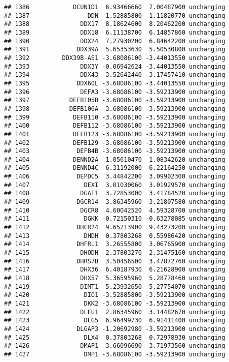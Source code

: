 \documentclass[]{article}
\begin{document}
\begin{verbatim}
## 1386            DCUN1D1  6.93466660  7.00487900 unchanging
## 1387                DDN -1.52885800 -1.11820770 unchanging
## 1388              DDX17  8.18624600  8.20462200 unchanging
## 1389              DDX18  6.11138700  6.14857860 unchanging
## 1390              DDX24  7.27930200  6.84642200 unchanging
## 1391             DDX39A  5.65353630  5.50530800 unchanging
## 1392         DDX39B-AS1 -3.68086100 -3.44013550 unchanging
## 1393              DDX3Y -0.06942624 -3.44013550 unchanging
## 1394              DDX43  3.52642440  3.17457410 unchanging
## 1395             DDX60L -3.68086100 -3.44013550 unchanging
## 1396              DEFA3 -3.68086100 -3.59213900 unchanging
## 1397           DEFB105B -3.68086100 -3.59213900 unchanging
## 1398           DEFB106A -3.68086100 -3.59213900 unchanging
## 1399            DEFB110 -3.68086100 -3.59213900 unchanging
## 1400            DEFB112 -3.68086100 -3.59213900 unchanging
## 1401            DEFB123 -3.68086100 -3.59213900 unchanging
## 1402            DEFB129 -3.68086100 -3.59213900 unchanging
## 1403             DEFB4B -3.68086100 -3.59213900 unchanging
## 1404            DENND2A  1.05610470  1.08342620 unchanging
## 1405            DENND4C  6.31192000  6.22164250 unchanging
## 1406             DEPDC5  3.44842200  3.09902300 unchanging
## 1407               DEXI  3.01030060  3.01929570 unchanging
## 1408              DGAT1  3.72853000  3.41784520 unchanging
## 1409             DGCR14  3.86345960  3.21807580 unchanging
## 1410              DGCR8  4.60042520  4.59328700 unchanging
## 1411               DGKK -0.72150310 -0.63278085 unchanging
## 1412             DHCR24  9.65213900  9.43273200 unchanging
## 1413               DHDH  0.37803268  0.55986420 unchanging
## 1414             DHFRL1  3.26555800  3.06765900 unchanging
## 1415              DHODH  2.37803270  2.31475160 unchanging
## 1416             DHRS7B  3.50456500  3.47872760 unchanging
## 1417              DHX36  6.40187930  6.21628900 unchanging
## 1418              DHX57  5.36595960  5.28778460 unchanging
## 1419              DIMT1  5.23932650  5.27754070 unchanging
## 1420               DIO1 -3.52885800 -3.59213900 unchanging
## 1421               DKK2 -3.68086100 -3.59213900 unchanging
## 1422              DLEU1  2.86345960  3.14482670 unchanging
## 1423               DLG5  6.96499730  6.91411400 unchanging
## 1424             DLGAP3 -1.20692980 -3.59213900 unchanging
## 1425               DLX4  0.37803268  0.72978930 unchanging
## 1426              DMAP1  3.66096690  3.71973560 unchanging
## 1427               DMP1 -3.68086100 -3.59213900 unchanging

\end{verbatim}
\end{document}

